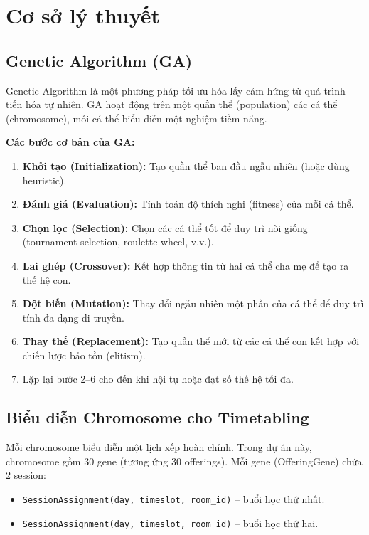 \section{Cơ sở lý thuyết}

\subsection{Genetic Algorithm (GA)}
Genetic Algorithm là một phương pháp tối ưu hóa lấy cảm hứng từ quá trình tiến hóa tự nhiên. GA hoạt động trên một quần thể (population) các cá thể (chromosome), mỗi cá thể biểu diễn một nghiệm tiềm năng.

\textbf{Các bước cơ bản của GA:}
\begin{enumerate}
    \item \textbf{Khởi tạo (Initialization):} Tạo quần thể ban đầu ngẫu nhiên (hoặc dùng heuristic).
    \item \textbf{Đánh giá (Evaluation):} Tính toán độ thích nghi (fitness) của mỗi cá thể.
    \item \textbf{Chọn lọc (Selection):} Chọn các cá thể tốt để duy trì nòi giống (tournament selection, roulette wheel, v.v.).
    \item \textbf{Lai ghép (Crossover):} Kết hợp thông tin từ hai cá thể cha mẹ để tạo ra thế hệ con.
    \item \textbf{Đột biến (Mutation):} Thay đổi ngẫu nhiên một phần của cá thể để duy trì tính đa dạng di truyền.
    \item \textbf{Thay thế (Replacement):} Tạo quần thể mới từ các cá thể con kết hợp với chiến lược bảo tồn (elitism).
    \item Lặp lại bước 2--6 cho đến khi hội tụ hoặc đạt số thế hệ tối đa.
\end{enumerate}

\subsection{Biểu diễn Chromosome cho Timetabling}
Mỗi chromosome biểu diễn một lịch xếp hoàn chỉnh. Trong dự án này, chromosome gồm 30 gene (tương ứng 30 offerings). Mỗi gene (OfferingGene) chứa 2 session:
\begin{itemize}
    \item \texttt{SessionAssignment(day, timeslot, room\_id)} -- buổi học thứ nhất.
    \item \texttt{SessionAssignment(day, timeslot, room\_id)} -- buổi học thứ hai.
\end{itemize}

